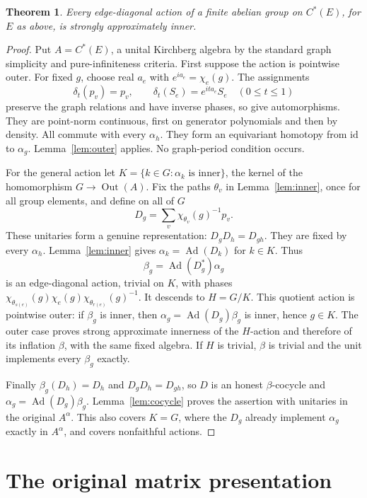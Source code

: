 \documentclass[11pt,a4paper]{article}
\newtheorem{theorem}{Theorem}
\theoremstyle{definition}
\newcommand{\Ad}{\operatorname{Ad}}
\begin{document}
\begin{theorem}\label{thm:graph}
Every edge-diagonal action of a finite abelian group on $C^*(E)$, for $E$
as above, is strongly approximately inner.
\end{theorem}
\begin{proof}
Put $A=C^*(E)$, a unital Kirchberg algebra by the standard graph
simplicity and pure-infiniteness criteria. First suppose the action is
pointwise outer. For fixed $g$, choose real $a_e$ with
$e^{ia_e}=\chi_e(g)$. The assignments
\[
 \delta_t(p_v)=p_v,\qquad
 \delta_t(S_e)=e^{ita_e}S_e\quad(0\leq t\leq1)
\]
preserve the graph relations and have inverse phases, so give
automorphisms. They are point-norm continuous, first on generator
polynomials and then by density. All commute with every $\alpha_h$.
They form an equivariant homotopy from $\mathrm{id}$ to $\alpha_g$.
Lemma~\ref{lem:outer} applies. No graph-period condition occurs.

For the general action let
$K=\{k\in G:\alpha_k\text{ is inner}\}$, the kernel of the homomorphism
$G\to\operatorname{Out}(A)$. Fix the paths $\theta_v$ in
Lemma~\ref{lem:inner}, once for all group elements, and define on all of $G$
\[
 D_g=\sum_v\chi_{\theta_v}(g)^{-1}p_v.
\]
These unitaries form a genuine representation: $D_gD_h=D_{gh}$.
They are fixed by every $\alpha_h$. Lemma~\ref{lem:inner} gives
$\alpha_k=\Ad(D_k)$ for $k\in K$. Thus
\[
 \beta_g=\Ad(D_g^*)\alpha_g
\]
is an edge-diagonal action, trivial on $K$, with phases
$\chi_{\theta_{s(e)}}(g)\chi_e(g)\chi_{\theta_{r(e)}}(g)^{-1}$.
It descends to $H=G/K$. This quotient action is pointwise outer:
if $\beta_g$ is inner, then $\alpha_g=\Ad(D_g)\beta_g$ is inner, hence
$g\in K$. The outer case proves strong approximate innerness of the
$H$-action and therefore of its inflation $\beta$, with the same fixed
algebra. If $H$ is trivial, $\beta$ is trivial and the unit implements
every $\beta_g$ exactly.

Finally $\beta_g(D_h)=D_h$ and $D_gD_h=D_{gh}$, so $D$ is an honest
$\beta$-cocycle and $\alpha_g=\Ad(D_g)\beta_g$.
Lemma~\ref{lem:cocycle} proves the assertion with unitaries in the
original $A^\alpha$. This also covers $K=G$, where the $D_g$ already
implement $\alpha_g$ exactly in $A^\alpha$, and covers nonfaithful actions.
\end{proof}

\section{The original matrix presentation}
\end{document}

